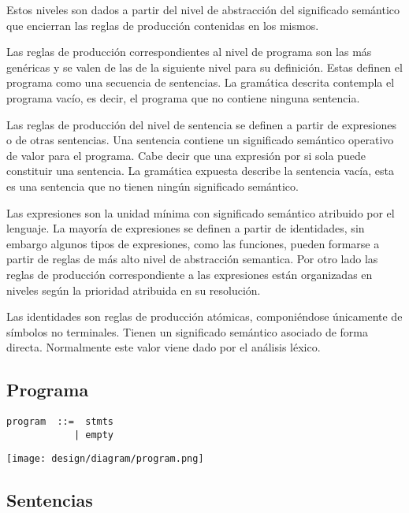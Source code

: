 Estos niveles son dados a partir del nivel de abstracción del significado 
semántico que encierran las reglas de producción contenidas en los mismos.

Las reglas de producción correspondientes al nivel de programa 
son las más genéricas y se valen de las de la siguiente nivel para 
su definición. Estas definen el programa como una secuencia de
sentencias. La gramática descrita contempla el programa vacío, es decir,
el programa que no contiene ninguna sentencia.

Las reglas de producción del nivel de sentencia se definen a 
partir de expresiones o de otras sentencias. Una sentencia contiene un significado semántico
operativo de valor para el programa. Cabe decir que una expresión por si sola 
puede constituir una sentencia. La gramática expuesta describe la sentencia
vacía, esta es una sentencia que no tienen ningún significado semántico.

Las expresiones son la unidad mínima con significado semántico atribuido por 
el lenguaje. La mayoría de expresiones se definen a partir de identidades, 
sin embargo algunos tipos de expresiones, como las funciones, pueden formarse
a partir de reglas de más alto nivel de abstracción semantica. Por otro lado las 
reglas de producción correspondiente a las expresiones están organizadas en niveles según
la prioridad atribuida en su resolución.

Las identidades son reglas de producción atómicas, componiéndose únicamente de símbolos no terminales. 
Tienen un significado semántico asociado de forma directa. Normalmente este valor viene dado por 
el análisis léxico.  
 
\subsection{Programa}
\begin{multicols}{2}
\begin{lstlisting}[style=nonumbers]
program  ::=  stmts
            | empty
\end{lstlisting}  
\columnbreak
\begin{center}
\texttt{[image: design/diagram/program.png]} 
\end{center}
\end{multicols}
\subsection{Sentencias}
